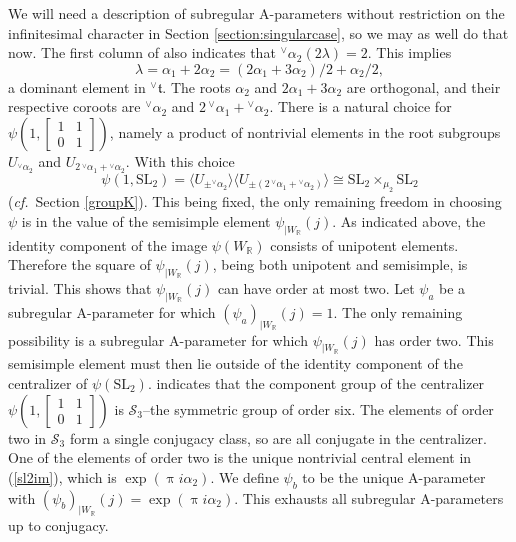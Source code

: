 \documentclass[a4paper, 11pt]{article}
\begin{document}
\begin{description}
We will
need a  description of subregular A-parameters without restriction on
the infinitesimal character in Section
\ref{section:singularcase}, 
so we may as well do that now. The first column of \cite[Table
  7.12]{HumphCC} also indicates that ${^\vee}\alpha_{2}(2\lambda) = 2$.
This implies 
\begin{equation}
\label{lampsi1}
\lambda =   \alpha_{1} + 2 \alpha_{2} = (2\alpha_{1}+ 3\alpha_{2})/2 +
\alpha_{2}/2,
\end{equation}
a dominant element in ${^\vee}\mathfrak{t}$.
The roots $\alpha_{2}$ and $2\alpha_{1} + 3\alpha_{2}$ are orthogonal,
and their respective coroots are ${^\vee}\alpha_{2}$ and $2 \,
{^\vee}\alpha_{1}+ {^\vee}\alpha_{2}$.  There is a natural choice for
$\psi(1, \begin{bmatrix} 1 & 1 \\ 0
  & 1 \end{bmatrix})$, namely a product of nontrivial elements in the
root subgroups $U_{{^\vee}\alpha_{2}}$ and $U_{2\, {^\vee}\alpha_{1} +
{^\vee}\alpha_{2}}$. With this choice
\begin{equation}
\label{sl2im}
\psi(1, \mathrm{SL}_{2}) = \langle U_{\pm{^\vee\alpha_{2}}} \rangle
\langle U_{\pm( 2 \, {^\vee}\alpha_{1}+ {^\vee}\alpha_{2})} \rangle \cong \mathrm{SL}_{2}
\times_{\mu_{2}} \mathrm{SL}_{2} 
\end{equation}
(\emph{cf.}~Section \ref{groupK}).
 This being fixed, the only remaining freedom in choosing $\psi$ is in
 the value of the 
semisimple element
$\psi_{|W_{\mathbb{R}}}(j)$. As indicated above, the identity
component of the image
$\psi(W_{\mathbb{R}})$ consists of unipotent elements. Therefore the square of 
$\psi_{|W_{\mathbb{R}}}(j)$, being  both unipotent and 
semisimple,  is trivial.   This shows that
$\psi_{|W_{\mathbb{R}}}(j)$ can have order 
at most two.  Let $\psi_{a}$ be a subregular A-parameter for which
$(\psi_{a})_{|W_{\mathbb{R}}}(j) = 1$.   The only remaining
possibility  is a subregular A-parameter for which
$\psi_{|W_{\mathbb{R}}}(j)$ has order two.   This semisimple element
must then lie outside of the identity component of the centralizer of
$\psi(\mathrm{SL}_{2})$.  \cite[Table 7.18]{HumphCC} indicates that the
component group of the centralizer $\psi(1, \begin{bmatrix} 1 & 1 \\ 0
  & 1 \end{bmatrix})$ is  $\mathcal{S}_{3}$--the symmetric group 
of order six.  The elements of order two in $\mathcal{S}_{3}$ form a
single conjugacy 
class, so are all conjugate in the centralizer.  One of the elements
of order two is the unique nontrivial central element in
(\ref{sl2im}), which is $\exp( \uppi i \alpha_{2})$.   We define
$\psi_{b}$ to be the unique A-parameter with
$(\psi_{b})_{|W_{\mathbb{R}}}(j) = \exp( \uppi i 
\alpha_{2})$. This exhausts all subregular  A-parameters up to conjugacy.


\end{description}
\end{document}
